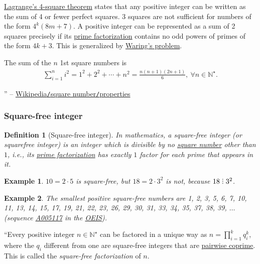 \documentclass{article}
\newtheorem{definition}{Definition}
\newtheorem{example}{Example}
\DeclareRobustCommand{\divby}{%
	\mathrel{\vbox{\baselineskip.65ex\lineskiplimit0pt\hbox{.}\hbox{.}\hbox{.}}}%
}
\begin{document}
\href{https://en.wikipedia.org/wiki/Lagrange%27s_four-square_theorem}{Lagrange's 4-square theorem} states that any positive integer can be written as the sum of 4 or fewer perfect squares. 3 squares are not sufficient for numbers of the form $4^k(8m + 7)$. A positive integer can be represented as a sum of 2 squares precisely if its \href{https://en.wikipedia.org/wiki/Prime_factorization}{prime factorization} contains no odd powers of primes of the form $4k + 3$. This is generalized by \href{https://en.wikipedia.org/wiki/Waring%27s_problem}{Waring's problem}.


The sum of the $n$ 1st square numbers is
\begin{align*}
	\boxed{\sum_{i=1}^n i^2 = 1^2 + 2^2 + \cdots + n^2 = \frac{n(n + 1)(2n + 1)}{6},\ \forall n\in\mathbb{N}^\star.}
\end{align*}

'' -- \href{https://en.wikipedia.org/wiki/Square_number#Properties}{Wikipedia\texttt{/}square number\texttt{/}properties}

\subsubsection{Square-free integer}

\begin{definition}[Square-free integer]
	In mathematics, a \emph{square-free integer} (or \emph{squarefree integer}) is an integer which is divisible by no \href{https://en.wikipedia.org/wiki/Square_number}{square number} other than $1$, i.e., its \href{https://en.wikipedia.org/wiki/Prime_factorization}{prime factorization} has exactly $1$ factor for each prime that appears in it.
\end{definition}

\begin{example}
	$10 = 2\cdot5$ is square-free, but $18 = 2\cdot3^2$ is not, because $18\divby3^2$.
\end{example}

\begin{example}
	The smallest positive square-free numbers are \emph{1, 2, 3, 5, 6, 7, 10, 11, 13, 14, 15, 17, 19, 21, 22, 23, 26, 29, 30, 31, 33, 34, 35, 37, 38, 39}, $\ldots$ (sequence \href{https://oeis.org/A005117}{A005117} in the \href{https://en.wikipedia.org/wiki/On-Line_Encyclopedia_of_Integer_Sequences}{OEIS}).
\end{example}
``Every positive integer $n\in\mathbb{N}^\star$ can be factored in a unique way as $n = \prod_{i=1}^k q_i^k$, where the $q_i$ different from one are square-free integers that are \href{https://en.wikipedia.org/wiki/Pairwise_coprime}{pairwise coprime}. This is called the \textit{square-free factorization} of $n$.
\end{document}
